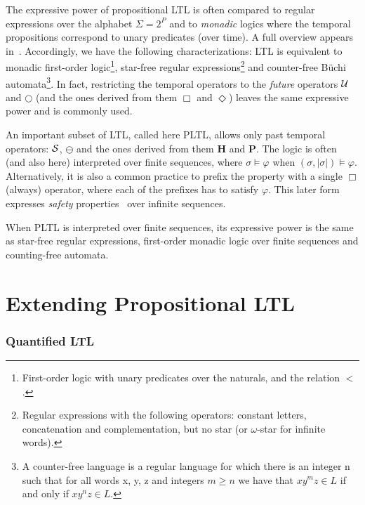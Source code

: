 The expressive power of propositional LTL is often compared to regular expressions
over the alphabet $\Sigma = 2^P$ and to  {\em monadic} logics where the temporal propositions
correspond to unary predicates (over time). A full overview appears in~\cite{Thomas}. Accordingly, we have the following characterizations:
LTL is equivalent to monadic first-order logic\footnote{First-order logic with unary predicates over the naturals, and the relation $<$.},  star-free regular expressions\footnote{Regular expressions with the following operators: constant letters, concatenation and complementation, but no star (or $\omega$-star for infinite words).} and counter-free B\"{u}chi automata\footnote{A counter-free language is a regular language for which there is an integer n such that for all words x, y, z and integers $m \geq n$ we have that $xy^m z \in L$ if and only if $xy^n z \in L$.}. In fact, restricting the temporal operators to the {\em future}  operators $\mathbin{\mathcal{U}}$ and $\bigcirc$
(and the ones derived from them $\Box$ and $\Diamond$)
leaves the same expressive power and is commonly used. 


An important subset of LTL, called here PLTL, allows only past temporal
operators: ${\cal S}$, $\ominus$ and the ones derived
from them $\mathbf{H}$ and $\mathbf{P}$. The logic is often
(and also here) interpreted over finite sequences, 
where $\sigma \models \varphi$ when $( \sigma , | \sigma | ) \models \varphi$.
Alternatively,
it is also a common practice to prefix the property with a single $\Box$ (always) operator, where each of the prefixes has to satisfy $\varphi$. This later
form expresses {\em safety} properties~\cite{AS} over infinite sequences. 



When PLTL is interpreted over finite sequences, its
expressive power is the same as star-free regular expressions, first-order monadic logic over finite sequences and counting-free automata.


\section{Extending Propositional LTL}

\subsubsection{Quantified LTL}

